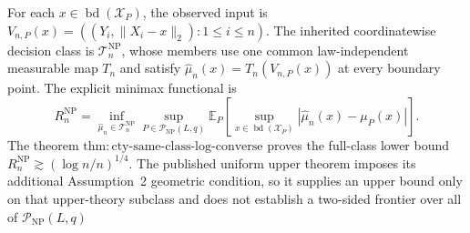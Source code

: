 For each \(x\in\operatorname{bd}(\mathcal X_P)\), the observed input is \(V_{n,P}(x)=((Y_i,\lVert X_i-x\rVert_2):1\leq i\leq n)\).  The inherited coordinatewise decision class is \(\mathcal T_n^{\mathrm{NP}}\), whose members use one common law-independent measurable map \(T_n\) and satisfy \(\widehat\mu_n(x)=T_n(V_{n,P}(x))\) at every boundary point.  The explicit minimax functional is
\[
 R_n^{\mathrm{NP}}
 =\inf_{\widehat\mu_n\in\mathcal T_n^{\mathrm{NP}}}
 \sup_{P\in\mathcal P_{\mathrm{NP}}(L,q)}
 \mathbb E_P\!\left[
 \sup_{x\in\operatorname{bd}(\mathcal X_P)}
 |\widehat\mu_n(x)-\mu_P(x)|
 \right].
\]
The theorem \(\mathrm{thm:cty\text{-}same\text{-}class\text{-}log\text{-}converse}\) proves the full-class lower bound \(R_n^{\mathrm{NP}}\gtrsim(\log n/n)^{1/4}\).  The published uniform upper theorem imposes its additional Assumption~2 geometric condition, so it supplies an upper bound only on that upper-theory subclass and does not establish a two-sided frontier over all of \(\mathcal P_{\mathrm{NP}}(L,q)\)